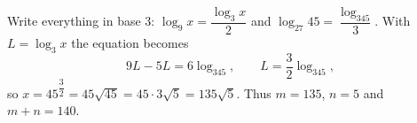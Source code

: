 Write everything in base $3$: $\log_9x=\dfrac{\log_3x}{2}$ and $\log_{27}45=\dfrac{\log_345}{3}$. With $L=\log_3x$ the equation becomes
\[9L-5L=6\log_345,\qquad L=\dfrac32\log_345,\]
so $x=45^{\dfrac32}=45\sqrt{45}=45\cdot3\sqrt5=135\sqrt5$. Thus $m=135$, $n=5$ and $m+n=\boxed{140}$.
